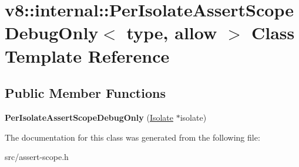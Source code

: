 \hypertarget{classv8_1_1internal_1_1_per_isolate_assert_scope_debug_only}{}\section{v8\+:\+:internal\+:\+:Per\+Isolate\+Assert\+Scope\+Debug\+Only$<$ type, allow $>$ Class Template Reference}
\label{classv8_1_1internal_1_1_per_isolate_assert_scope_debug_only}
\subsection*{Public Member Functions}
\begin{DoxyCompactItemize}
\item 
\hypertarget{classv8_1_1internal_1_1_per_isolate_assert_scope_debug_only_a51539975c189358a1eb6c6f3539945cb}{}{\bfseries Per\+Isolate\+Assert\+Scope\+Debug\+Only} (\hyperlink{classv8_1_1internal_1_1_isolate}{Isolate} $\ast$isolate)\label{classv8_1_1internal_1_1_per_isolate_assert_scope_debug_only_a51539975c189358a1eb6c6f3539945cb}

\end{DoxyCompactItemize}


The documentation for this class was generated from the following file\+:\begin{DoxyCompactItemize}
\item 
src/assert-\/scope.\+h\end{DoxyCompactItemize}
